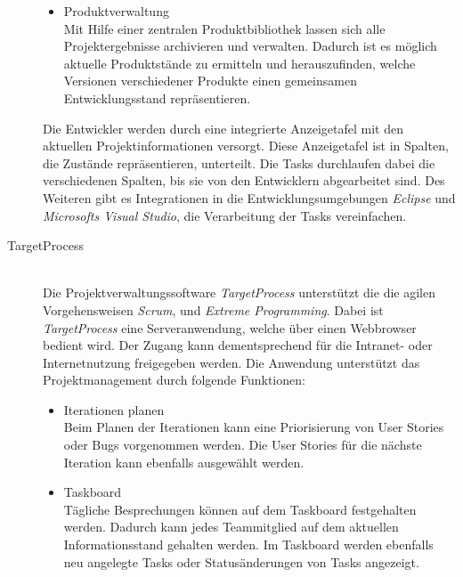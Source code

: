 \begin{description}
\begin{itemize}
\item Produktverwaltung\\
Mit Hilfe einer zentralen Produktbibliothek lassen sich alle Projektergebnisse archivieren und verwalten. Dadurch ist es möglich aktuelle Produktstände zu ermitteln und herauszufinden, welche Versionen verschiedener Produkte einen gemeinsamen Entwicklungsstand repräsentieren.

\end{itemize}

Die Entwickler werden durch eine integrierte Anzeigetafel mit den aktuellen Projektinformationen versorgt. Diese Anzeigetafel ist in Spalten, die Zustände repräsentieren, unterteilt. Die Tasks durchlaufen dabei die verschiedenen Spalten, bis sie von den Entwicklern abgearbeitet sind. Des Weiteren gibt es Integrationen in die Entwicklungsumgebungen \emph{Eclipse} und \emph{Microsofts Visual Studio}, die Verarbeitung der Tasks vereinfachen. \cite {bib:instep} \\


\item[TargetProcess]\hspace*{1em}\\
Die Projektverwaltungssoftware \emph{TargetProcess} unterstützt die die agilen Vorgehensweisen \emph{Scrum}, und \emph{Extreme Programming}. Dabei ist \emph{TargetProcess} eine Serveranwendung, welche über einen Webbrowser bedient wird. Der Zugang kann dementsprechend für die Intranet- oder Internetnutzung freigegeben werden.
Die Anwendung unterstützt das Projektmanagement durch folgende Funktionen:
\begin{itemize}
\item Iterationen planen\\
Beim Planen der Iterationen kann eine Priorisierung von User Stories oder Bugs vorgenommen werden. Die User Stories für die nächste Iteration kann ebenfalls ausgewählt werden.

\item Taskboard\\
Tägliche Besprechungen können auf dem Taskboard festgehalten werden. Dadurch kann jedes Teammitglied auf dem aktuellen Informationsstand gehalten werden. Im Taskboard werden ebenfalls neu angelegte Tasks oder Statusänderungen von Tasks angezeigt.


\end{itemize}
\end{description}
